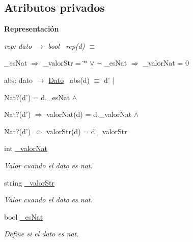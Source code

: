 \subsection*{Atributos privados}
\begin{Indent}{\bf Representación}\par
{\em rep\+: dato $\to$ bool~\newline
rep(d) $\equiv$
\begin{DoxyItemize}
\item \+\_\+es\+Nat $\Rightarrow$ \+\_\+valor\+Str = \char`\"{}\char`\"{} $\lor$ $\lnot$ \+\_\+es\+Nat $\Rightarrow$ \+\_\+valor\+Nat = 0
\end{DoxyItemize}

abs\+: dato $\to$ \hyperlink{classDato}{Dato}~\newline
abs(d) $\equiv$ d' $|$
\begin{DoxyItemize}
\item Nat?(d') = d.\+\_\+es\+Nat $\land$
\item Nat?(d') $\Rightarrow$ valor\+Nat(d) = d.\+\_\+valor\+Nat $\land$
\item Nat?(d') $\Rightarrow$ valor\+Str(d) = d.\+\_\+valor\+Str 
\end{DoxyItemize}}\begin{DoxyCompactItemize}
\item 
\hypertarget{classDato_a117b034b0acbfb4b602ab5445855f3f1}{int \hyperlink{classDato_a117b034b0acbfb4b602ab5445855f3f1}{\+\_\+valor\+Nat}}\label{classDato_a117b034b0acbfb4b602ab5445855f3f1}

\begin{DoxyCompactList}\small\item\em Valor cuando el dato es nat. \end{DoxyCompactList}\item 
\hypertarget{classDato_a4abdad075253c04b649282227a01bbed}{string \hyperlink{classDato_a4abdad075253c04b649282227a01bbed}{\+\_\+valor\+Str}}\label{classDato_a4abdad075253c04b649282227a01bbed}

\begin{DoxyCompactList}\small\item\em Valor cuando el dato es nat. \end{DoxyCompactList}\item 
\hypertarget{classDato_a43a0578f47ccb55da86088491f862bf9}{bool \hyperlink{classDato_a43a0578f47ccb55da86088491f862bf9}{\+\_\+es\+Nat}}\label{classDato_a43a0578f47ccb55da86088491f862bf9}

\begin{DoxyCompactList}\small\item\em Define si el dato es nat. \end{DoxyCompactList}\end{DoxyCompactItemize}
\end{Indent}
